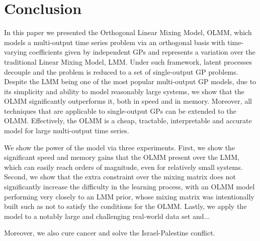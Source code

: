 \documentclass{article}
\begin{document}
\section{Conclusion}
\label{sec:conclusion}

In this paper we presented the Orthogonal Linear Mixing Model, OLMM, which models a multi-output time series problem via an orthogonal basis with time-varying coefficients given by independent GPs and represents a variation over the traditional Linear Mixing Model, LMM.
Under such framework, latent processes decouple and the problem is reduced to a set of single-output GP problems.
Despite the LMM being one of the most popular multi-output GP models, due to its simplicity and ability to model reasonably large systems, we show that the OLMM significantly outperforms it, both in speed and in memory. 
Moreover, all techniques that are applicable to single-output GPs can be extended to the OLMM.
Effectively, the OLMM is a cheap, tractable, interpretable and accurate model for large multi-output time series.

We show the power of the model via three experiments. 
First, we show the significant speed and memory gains that the OLMM present over the LMM, which can easily reach orders of magnitude, even for relatively small systems.
Second, we show that the extra constraint over the mixing matrix does not significantly increase the difficulty in the learning process, with an OLMM model performing very closely to an LMM prior, whose mixing matrix was intentionally built such as not to satisfy the conditions for the OLMM.
Lastly, we apply the model to a notably large and challenging real-world data set and...

Moreover, we also cure cancer and solve the Israel-Palestine conflict.

\clearpage


\end{document}

